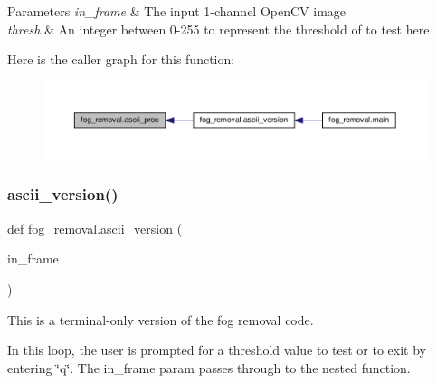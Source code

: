 \begin{DoxyParams}{Parameters}
{\em in\+\_\+frame} & The input 1-\/channel Open\+CV image \\
\hline
{\em thresh} & An integer between 0-\/255 to represent the threshold of to test here \\
\hline
\end{DoxyParams}
Here is the caller graph for this function\+:\nopagebreak
\begin{figure}[H]
\begin{center}
\leavevmode
\includegraphics[width=350pt]{namespacefog__removal_a50fdb2a1e3f55a7f77230a689a372876_icgraph}
\end{center}
\end{figure}
\mbox{\label{namespacefog__removal_a6e25df53e59d9d8848b5e2ed5a399ea3}} 
\subsubsection{\texorpdfstring{ascii\+\_\+version()}{ascii\_version()}}
{\footnotesize\ttfamily def fog\+\_\+removal.\+ascii\+\_\+version (\begin{DoxyParamCaption}\item[{}]{in\+\_\+frame }\end{DoxyParamCaption})}



This is a terminal-\/only version of the fog removal code. 

In this loop, the user is prompted for a threshold value to test or to exit by entering \char`\"{}q\char`\"{}. The in\+\_\+frame param passes through to the nested function.


